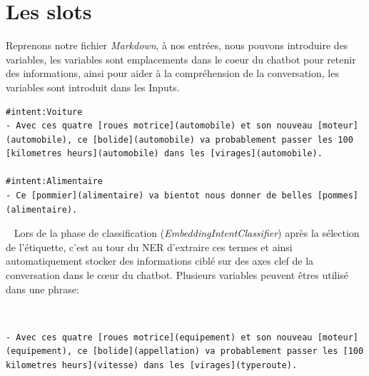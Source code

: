 \pagebreak
\section{Les slots}

Reprenons notre fichier \textit{Markdown}, à nos entrées, nous pouvons introduire des variables, les variables sont emplacements dans le coeur du chatbot pour retenir des informations, ainsi pour aider à la compréhension de la conversation, les variables sont introduit dans les Inputs.
\ \linebreak
\begin{lstlisting}
#intent:Voiture
- Avec ces quatre [roues motrice](automobile) et son nouveau [moteur](automobile), ce [bolide](automobile) va probablement passer les 100 [kilometres heurs](automobile) dans les [virages](automobile).

#intent:Alimentaire
- Ce [pommier](alimentaire) va bientot nous donner de belles [pommes](alimentaire).
\end{lstlisting}
\ \linebreak
Lors de la phase de classification (\textit{EmbeddingIntentClassifier}) après la sélection de l'étiquette, c'est au tour du NER d'extraire ces termes et ainsi automatiquement stocker des informations ciblé sur des axes clef de la conversation dans le cœur du chatbot. Plusieurs variables peuvent êtres utilisé dans une phrase:

\ \linebreak
\begin{lstlisting}
- Avec ces quatre [roues motrice](equipement) et son nouveau [moteur](equipement), ce [bolide](appellation) va probablement passer les [100 kilometres heurs](vitesse) dans les [virages](typeroute).
\end{lstlisting}
\ \linebreak 